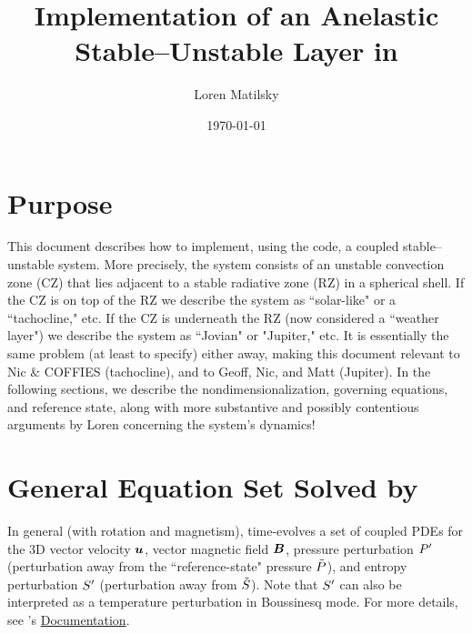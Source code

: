 \documentclass[12pt]{article}
\date{\today}
\author{Loren Matilsky}
\title{Implementation of an Anelastic Stable--Unstable Layer in {\rayleigh}}
\numberwithin{equation}{section}
\begin{document}
	\maketitle
	\section{Purpose}\label{sec:purpose}
	This document describes how to implement, using the {\rayleigh} code, a coupled stable--unstable system. More precisely, the system consists of an unstable convection zone (CZ) that lies adjacent to a stable radiative zone (RZ) in a spherical shell. If the CZ is on top of the RZ we describe the system as ``solar-like" or a ``tachocline," etc. If the CZ is underneath the RZ (now considered a ``weather layer") we describe the system as ``Jovian" or "Jupiter," etc. It is essentially the same problem (at least to specify) either away, making this document relevant to Nic \& COFFIES (tachocline), and to Geoff, Nic, and Matt (Jupiter). In the following sections, we describe the nondimensionalization, governing equations, and reference state, along with more substantive and possibly contentious arguments by Loren concerning the system's dynamics!
	
	\section{General Equation Set Solved by {\rayleigh}}\label{sec:eqgen}
	In general (with rotation and magnetism), {\rayleigh} time-evolves a set of coupled PDEs for the 3D vector velocity $\bm{u}$, vector magnetic field $\bm{B}$, pressure perturbation ${P^\prime}$ (perturbation away from the ``reference-state" pressure $\tilde{P}$), and entropy perturbation ${S^\prime}$ (perturbation away from $\tilde{S}$). Note that ${S^\prime}$ can also be interpreted as a temperature perturbation in Boussinesq mode. For more details, see {\rayleigh}'s \href{https://rayleigh-documentation.readthedocs.io/en/latest/doc/source/User_Guide/physics_math_overview.html#the-system-of-equations-solved-in-rayleigh}{Documentation}. 
	
\end{document}
